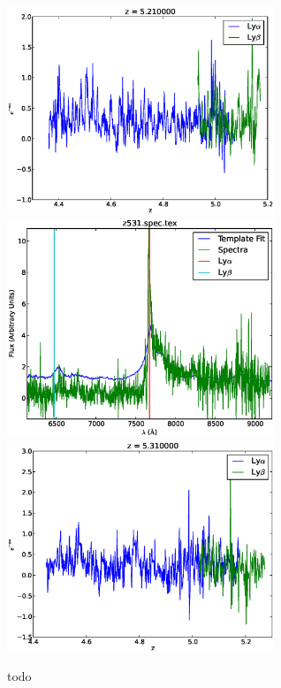 \documentclass[11pt]{article}
\begin{document}
\begin{figure}[h]
  \includegraphics[width=8cm]{z521.spec_Transmission.eps}
  \includegraphics[width=8cm]{z531.spec.eps}
  \includegraphics[width=8cm]{z531.spec_Transmission.eps}
  \caption{todo}
  \label{fig:todo}
\end{figure}
\end{document}
